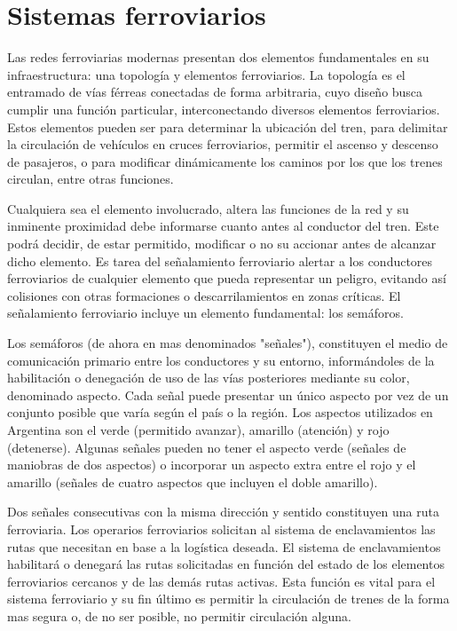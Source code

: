 \section{Sistemas ferroviarios}

    Las redes ferroviarias modernas presentan dos elementos fundamentales en su infraestructura: una topología y elementos ferroviarios. La topología es el entramado de vías férreas conectadas de forma arbitraria, cuyo diseño busca cumplir una función particular, interconectando diversos elementos ferroviarios. Estos elementos pueden ser para determinar la ubicación del tren, para delimitar la circulación de vehículos en cruces ferroviarios, permitir el ascenso y descenso de pasajeros, o para modificar dinámicamente los caminos por los que los trenes circulan, entre otras funciones.

    Cualquiera sea el elemento involucrado, altera las funciones de la red y su inminente proximidad debe informarse cuanto antes al conductor del tren. Este podrá decidir, de estar permitido, modificar o no su accionar antes de alcanzar dicho elemento. Es tarea del señalamiento ferroviario alertar a los conductores ferroviarios de cualquier elemento que pueda representar un peligro, evitando así colisiones con otras formaciones o descarrilamientos en zonas críticas. El señalamiento ferroviario incluye un elemento fundamental: los semáforos.

    Los semáforos (de ahora en mas denominados "señales"), constituyen el medio de comunicación primario entre los conductores y su entorno, informándoles de la habilitación o denegación de uso de las vías posteriores mediante su color, denominado aspecto. Cada señal puede presentar un único aspecto por vez de un conjunto posible que varía según el país o la región. Los aspectos utilizados en Argentina son el verde (permitido avanzar), amarillo (atención) y rojo (detenerse). Algunas señales pueden no tener el aspecto verde (señales de maniobras de dos aspectos) o incorporar un aspecto extra entre el rojo y el amarillo (señales de cuatro aspectos que incluyen el doble amarillo).
    
    Dos señales consecutivas con la misma dirección y sentido constituyen una ruta ferroviaria. Los operarios ferroviarios solicitan al sistema de enclavamientos las rutas que necesitan en base a la logística deseada. El sistema de enclavamientos habilitará o denegará las rutas solicitadas en función del estado de los elementos ferroviarios cercanos y de las demás rutas activas. Esta función es vital para el sistema ferroviario y su fin último es permitir la circulación de trenes de la forma mas segura o, de no ser posible, no permitir circulación alguna.

